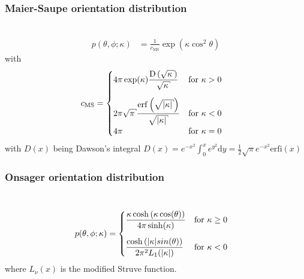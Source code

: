 
\newpage
\subsubsection{Maier-Saupe orientation distribution} ~\\

\begin{align}
p(\theta,\phi;\kappa) & = \frac{1}{c_\mathrm{MS}}\exp\left(\kappa \cos^2\theta\right) 
\end{align}
with
\begin{align}
c_\mathrm{MS} &=
\begin{cases} 
\displaystyle
4\pi\exp(\kappa) \frac{\mathrm{D}\left(\sqrt{\kappa}\right)}{\sqrt{\kappa}}   &\mathrm{for~} \kappa > 0 \\[5mm]
\displaystyle
2\pi \sqrt{\pi} \frac{\mathrm{erf}\left(\sqrt{\abs{\kappa}}\right)}{\sqrt{\abs{\kappa}}}  &\mathrm{for~} \kappa < 0 \\[2mm]
\displaystyle
4\pi                                                                                      &\mathrm{for~} \kappa = 0
\end{cases}
\end{align}
with $D(x)$ being Dawson's integral $D(x)=e^{-x^2}\int_0^x e^{y^2} \mathrm{d}y = \frac12\sqrt{\pi}e^{-x^2}\mathrm{erfi}(x)$

\newpage
\subsubsection{Onsager orientation distribution} ~\\

\begin{align}
p(\theta,\phi;\kappa) & = 
\begin{cases} \displaystyle
\frac{\kappa \cosh\left(\kappa \cos(\theta)\right)}{4\pi \sinh(\kappa)}      &\mathrm{for~} \kappa \geq 0 \\[5mm]
 \displaystyle
\frac{\cosh\left(\abs{\kappa} sin(\theta)\right)}{2\pi^2 L_1(\abs{\kappa})}  &\mathrm{for~} \kappa < 0 
\end{cases}
\end{align}
where $L_\nu(x)$ is the modified Struve function.

